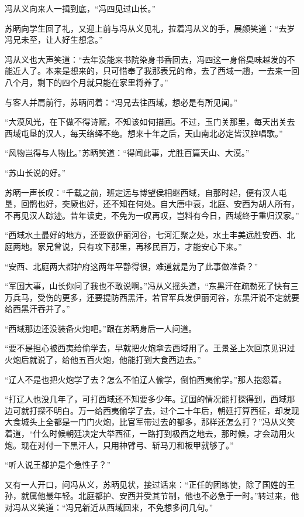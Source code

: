 冯从义向来人一揖到底，“冯四见过山长。”

苏昞向学生回了礼，又迎上前与冯从义见礼，拉着冯从义的手，展颜笑道：“去岁冯兄未至，让人好生想念。”

冯从义也大声笑道：“去年没能来书院染身书香回去，冯四这一身俗臭味越发的不能近人了。本来是想来的，只可惜奉了我那表兄的命，去了西域一趟，一去来一回八个月，剩下的四个月就只能在家里将养了。”

与客人并肩前行，苏昞问着：“冯兄去往西域，想必是有所见闻。”

“大漠风光，在下做不得诗赋，不知该如何描画。不过，玉门关那里，每天出关去西域屯垦的汉人，每天络绎不绝。想来十年之后，天山南北必定皆汉腔唱歌。”

“风物岂得与人物比。”苏昞笑道：“得闻此事，尤胜百篇天山、大漠。”

“苏山长说的好。”

苏昞一声长叹：“千载之前，班定远与博望侯相继西域，自那时起，便有汉人屯垦，回鹘也好，突厥也好，还不知在何处。自大唐中衰，北庭、安西为胡人所有，不再见汉人踪迹。昔年读史，不免为一叹再叹，岂料有今日，西域终于重归汉家。”

“西域水土最好的地方，还要数伊丽河谷，七河汇聚之处，水土丰美远胜安西、北庭两地。家兄曾说，只有攻下那里，再移民百万，才能安心下来。”

“安西、北庭两大都护府这两年平静得很，难道就是为了此事做准备？”

“军国大事，山长你问了我也不敢说啊。”冯从义摇头道，“东黑汗在疏勒死了快有三万兵马，受伤的更多，还要提防西黑汗，若官军兵发伊丽河谷，东黑汗说不定就要给西黑汗吞并了。”

“西域那边还没装备火炮吧。”跟在苏昞身后一人问道。

“要不是担心被西夷给偷学去，早就把火炮拿去西域用了。王景圣上次回京见识过火炮后就说了，给他五百火炮，他能打到大食西边去。”

“辽人不是也把火炮学了去？怎么不怕辽人偷学，倒怕西夷偷学。”那人抱怨着。

“打辽人也没几年了，可打西域还不知要多少年。辽国的情况能打探得到，西域那边可就打探不明白。万一给西夷偷学了去，过个二十年后，朝廷打算西征，却发现大食城头上全都是一门门火炮，比官军带过去的都多，那样还怎么打？”冯从义笑着道，“什么时候朝廷决定大举西征，一路打到极西之地去，那时候，才会动用火炮。现在对付一下黑汗人，只用神臂弓、斩马刀和板甲就够了。”

“听人说王都护是个急性子？”

又有一人开口，问冯从义，苏昞见状，接过话来：“正任的团练使，除了国姓的王孙，就属他最年轻。北庭都护、安西并受其节制，他也不必急于一时。”转过来，他对冯从义笑道：“冯兄新近从西域回来，不免想多问几句。”

